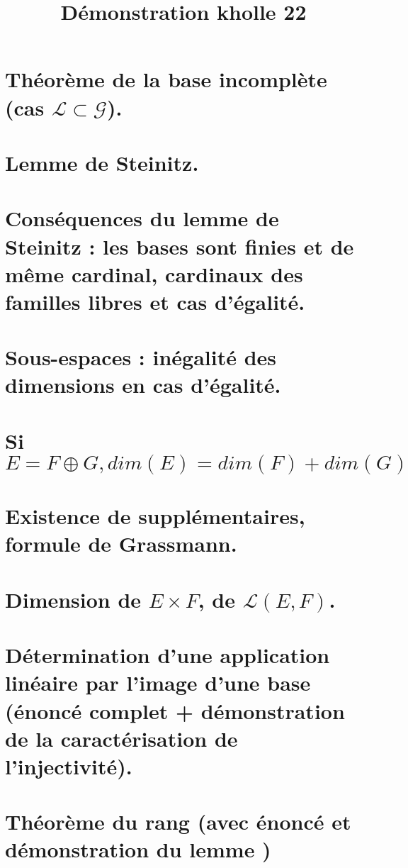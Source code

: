 \documentclass{article}
\begin{document}
\title{Démonstration kholle 22}
\date{}
\maketitle
	\renewcommand{\thesection}{\Roman{section}}
	\setlength{\parindent}{1.5cm}
\section{Théorème de la base incomplète (cas $\mathcal L \subset \mathcal G$).}
\section{Lemme de Steinitz.}
\section{Conséquences du lemme de Steinitz : les bases sont finies et de même cardinal, cardinaux des familles libres et cas d'égalité.}
\section{Sous-espaces : inégalité des dimensions en cas d'égalité. }
\section{Si $E= F \oplus G, dim(E)=dim(F)+dim(G)$}
\section{Existence de supplémentaires, formule de Grassmann.}
\section{Dimension de $E \times F$, de $\mathcal L(E,F)$.}
\section{Détermination d'une application linéaire par l'image d'une base (énoncé complet + démonstration de la caractérisation de l'injectivité).}
\section{Théorème du rang (avec énoncé et démonstration du lemme )}
\end{document}
